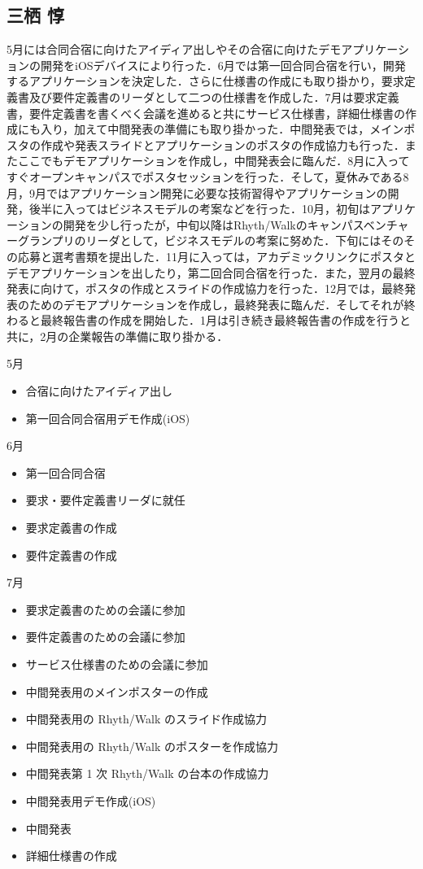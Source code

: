 \subsection{三栖 惇}
\par
5月には合同合宿に向けたアイディア出しやその合宿に向けたデモアプリケーションの開発をiOSデバイスにより行った．6月では第一回合同合宿を行い，開発するアプリケーションを決定した．さらに仕様書の作成にも取り掛かり，要求定義書及び要件定義書のリーダとして二つの仕様書を作成した．7月は要求定義書，要件定義書を書くべく会議を進めると共にサービス仕様書，詳細仕様書の作成にも入り，加えて中間発表の準備にも取り掛かった．中間発表では，メインポスタの作成や発表スライドとアプリケーションのポスタの作成協力も行った．またここでもデモアプリケーションを作成し，中間発表会に臨んだ．8月に入ってすぐオープンキャンパスでポスタセッションを行った．そして，夏休みである8月，9月ではアプリケーション開発に必要な技術習得やアプリケーションの開発，後半に入ってはビジネスモデルの考案などを行った．10月，初旬はアプリケーションの開発を少し行ったが，中旬以降はRhyth/Walkのキャンパスベンチャーグランプリのリーダとして，ビジネスモデルの考案に努めた．下旬にはそのその応募と選考書類を提出した．11月に入っては，アカデミックリンクにポスタとデモアプリケーションを出したり，第二回合同合宿を行った．また，翌月の最終発表に向けて，ポスタの作成とスライドの作成協力を行った．12月では，最終発表のためのデモアプリケーションを作成し，最終発表に臨んだ．そしてそれが終わると最終報告書の作成を開始した．1月は引き続き最終報告書の作成を行うと共に，2月の企業報告の準備に取り掛かる．
\par
5月
\begin{itemize}
\item 合宿に向けたアイディア出し
\item 第一回合同合宿用デモ作成(iOS)
\end{itemize}
6月
\begin{itemize}
\item 第一回合同合宿
\item 要求・要件定義書リーダに就任
\item 要求定義書の作成
\item 要件定義書の作成
\end{itemize}
7月
\begin{itemize}
\item 要求定義書のための会議に参加
\item 要件定義書のための会議に参加
\item サービス仕様書のための会議に参加
\item 中間発表用のメインポスターの作成
\item 中間発表用の Rhyth/Walk のスライド作成協力
\item 中間発表用の Rhyth/Walk のポスターを作成協力
\item 中間発表第 1 次 Rhyth/Walk の台本の作成協力
\item 中間発表用デモ作成(iOS)
\item 中間発表
\item 詳細仕様書の作成
\end{itemize}
